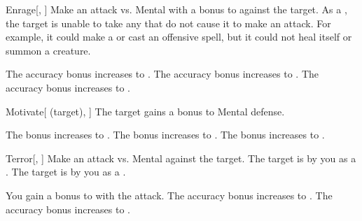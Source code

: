 \lowercase{\hypertarget{spell:Enrage}{}}\label{spell:Enrage}
\begin{freeability}[Rank 1]{\hypertarget{spell:Enrage}{Enrage}}[, ]
Make an attack vs. Mental with a  bonus to  against the target.
\hit As a , the target is unable to take any  that do not cause it to make an attack.
For example, it could make a  or cast an offensive spell, but it could not heal itself or summon a creature.

\rankline
{} The accuracy bonus increases to .
 The accuracy bonus increases to .
 The accuracy bonus increases to .
\end{freeability}
\vspace{0.25em}



\lowercase{\hypertarget{spell:Motivate}{}}\label{spell:Motivate}
\begin{attuneability}[Rank 1]{\hypertarget{spell:Motivate}{Motivate}}[ (target), ]
The target gains a  bonus to Mental defense.

\rankline
{} The bonus increases to .
 The bonus increases to .
 The bonus increases to .
\end{attuneability}
\vspace{0.25em}



\lowercase{\hypertarget{spell:Terror}{}}\label{spell:Terror}
\begin{freeability}[Rank 1]{\hypertarget{spell:Terror}{Terror}}[, ]
Make an attack vs. Mental against the target.
\hit The target is \shaken by you as a .
\crit The target is  by you as a .

\rankline
{} You gain a  bonus to  with the attack.
 The accuracy bonus increases to .
 The accuracy bonus increases to .
\end{freeability}
\vspace{0.25em}



